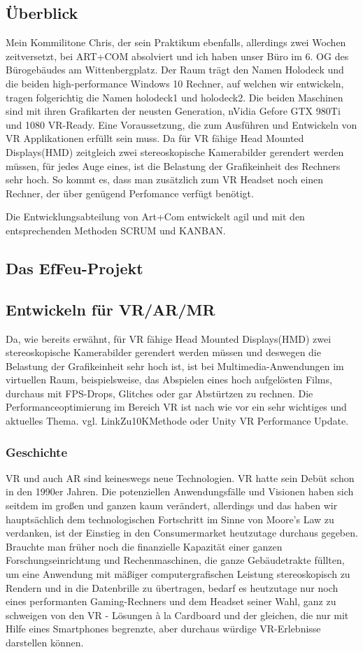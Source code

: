 \documentclass[a4paper,12pt]{scrartcl}
\begin{document}
\subsection{Überblick}
Mein Kommilitone Chris, der sein Praktikum ebenfalls, allerdings zwei Wochen zeitversetzt, bei ART+COM absolviert und ich haben unser Büro im 6. OG des Bürogebäudes am Wittenbergplatz. Der Raum trägt den Namen Holodeck und die beiden high-performance Windows 10 Rechner, auf welchen wir entwickeln, tragen folgerichtig die Namen holodeck1 und holodeck2. Die beiden Maschinen sind mit ihren Grafikarten der neusten Generation, nVidia Gefore GTX 980Ti und 1080 VR-Ready. Eine  Voraussetzung, die zum Ausführen und Entwickeln von VR Applikationen erfüllt sein muss. Da für VR fähige Head Mounted Displays(HMD) zeitgleich zwei stereoskopische Kamerabilder gerendert werden müssen, für jedes Auge eines, ist die Belastung der Grafikeinheit des Rechners sehr hoch. So kommt es, dass man zusätzlich zum VR Headset noch einen Rechner, der über genügend Perfomance verfügt benötigt.

Die Entwicklungsabteilung von Art+Com entwickelt agil und mit den entsprechenden Methoden SCRUM und KANBAN.

\subsection{Das EfFeu-Projekt}
\subsection{Entwickeln für VR/AR/MR}
Da, wie bereits erwähnt, für VR fähige Head Mounted Displays(HMD) zwei stereoskopische Kamerabilder gerendert werden müssen und deswegen die Belastung der Grafikeinheit sehr hoch ist, ist bei Multimedia-Anwendungen im virtuellen Raum, beispielsweise, das Abspielen eines hoch aufgelösten Films, durchaus mit FPS-Drops, Glitches oder gar Abstürtzen zu rechnen. Die Performanceoptimierung im Bereich VR ist nach wie vor ein sehr wichtiges und aktuelles Thema. vgl. LinkZu10KMethode oder Unity VR Performance Update.
\subsubsection{Geschichte}
VR und auch AR sind keineswegs neue Technologien.
VR hatte sein Debüt schon in den 1990er Jahren. Die potenziellen Anwendungsfälle und Visionen haben sich seitdem im großen und ganzen kaum verändert, allerdings und das haben wir hauptsächlich dem technologischen Fortschritt im Sinne von Moore's Law zu verdanken, ist der Einstieg in den Consumermarket heutzutage durchaus gegeben. Brauchte man früher noch die finanzielle Kapazität einer ganzen Forschungseinrichtung und Rechenmaschinen, die ganze Gebäudetrakte füllten, um eine Anwendung mit mäßiger computergrafischen Leistung stereoskopisch zu Rendern und in die Datenbrille zu übertragen, bedarf es heutzutage nur noch eines performanten Gaming-Rechners und dem Headset seiner Wahl, ganz zu schweigen von den VR - Lösungen à la Cardboard und der gleichen, die nur mit Hilfe eines Smartphones begrenzte, aber durchaus würdige VR-Erlebnisse darstellen können.
\end{document}
